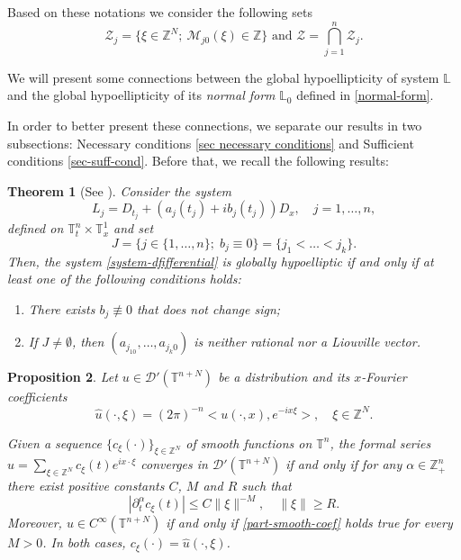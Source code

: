 \documentclass[12pt]{elsarticle}
\newtheorem{theorem}{Theorem}[section]
\newtheorem{proposition}[theorem]{Proposition}
\numberwithin{equation}{section}
\begin{document}
Based on these notations we consider the following sets 
\begin{equation}\label{Z sets}
\mathcal{Z}_j = \{\xi \in \mathbb{Z}^N; \ \mathcal{M}_{j0}(\xi) \in \mathbb{Z} \}
\textrm{ and } \mathcal{Z} = \bigcap_{j=1}^{n} \mathcal{Z}_j.
\end{equation}


We will present some connections between the global hypoellipticity of system  $\mathbb{L}$ and the global hypoellipticity of its \textit{normal form} $\mathbb{L}_0$ defined in \eqref{normal-form}.



In order to better present these connections, we separate our results in two subsections: Necessary conditions \ref{sec necessary conditions} and Sufficient conditions \ref{sec-suff-cond}.  Before that,  we recall the following results:

\begin{theorem}[See \cite{BCM93}]\label{The-diff-system}
	Consider the system 
	\begin{equation}\label{system-dfifferential}
	L_j = D_{t_j} + (a_j(t_j)+ ib_j(t_j)) D_x, \quad j=1,\ldots,n,
	\end{equation}	
defined on $\mathbb{T}_t^n
\times \mathbb{T}_x^1$ and set 
	$$
	J=\{j\in\{1,\ldots,n\};\; b_j\equiv0\}=\{j_1< \ldots< j_k\}.
	$$  	
	Then, the system \eqref{system-dfifferential} is globally hypoelliptic if and only if at least one of the follow\-ing conditions holds:	
	\begin{enumerate}
		\item[a)] There exists $b_j\not\equiv 0$ that does not change sign; 
		\item[b)] If $J\neq \emptyset$, then $(a_{j_10}, \ldots, a_{j_k0})$ is neither rational nor a Liouville vector.
	\end{enumerate}
	
\end{theorem}



\begin{proposition}\label{prop-smooth}
	Let $u \in \mathcal{D}'(\mathbb{T}^{n+N})$ be a distribution and  its $x$-Fourier coeffi\-cients
	\begin{equation*}
	\widehat{u}(\cdot, \xi) = (2 \pi)^{-n} <u(\cdot, x),  e^{-i x\xi}>,  \quad
	\xi \in \mathbb{Z}^N.
	\end{equation*}
	
	Given a sequence $\{c_{\xi}(\cdot)\}_{\xi \in \mathbb{Z}^N}$ of smooth functions on $\mathbb{T}^n$, the formal series $u = \sum_{\xi \in \mathbb{Z}^{N}}{c_\xi(t) e^{i  x \cdot \xi}}$ 	converges in $\mathcal{D}'(\mathbb{T}^{n+N})$ if and only if for any $\alpha \in \mathbb{Z}_+^n$ there exist positive constants $C$, $M$ and $R$ such that
	\begin{equation}\label{part-smooth-coef}
	|\partial^{\alpha}_t c_{\xi}(t)| \leq C \|\xi\|^{-M}, \quad \|\xi\|\geq R.
	\end{equation}
	Moreover, $u \in C^{\infty}(\mathbb{T}^{n+N})$ if and only if \eqref{part-smooth-coef} holds true for every $M>0$. In both cases, 
	$c_{\xi}(\cdot) = \widehat{u}(\cdot, \xi)$.
\end{proposition}
\end{document}

